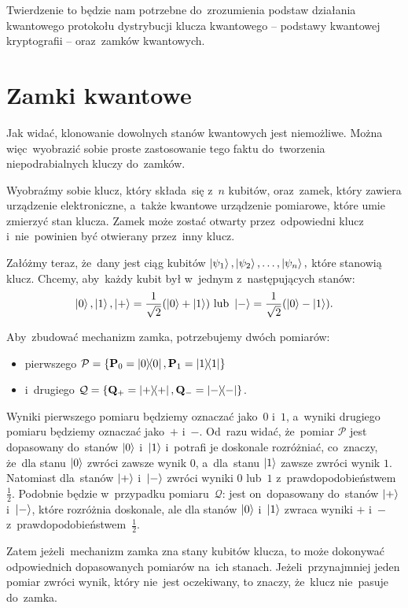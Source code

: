 Twierdzenie to będzie nam potrzebne do~zrozumienia podstaw działania kwantowego
protokołu dystrybucji klucza kwantowego -- podstawy kwantowej kryptografii --
oraz~zamków kwantowych.

\section{Zamki kwantowe}
Jak widać, klonowanie dowolnych stanów kwantowych jest niemożliwe. Można więc~wyobrazić
sobie proste zastosowanie tego faktu do~tworzenia niepodrabialnych
kluczy do~zamków.

Wyobraźmy sobie klucz, który składa~się z~$n$ kubitów, oraz~zamek, który zawiera
urządzenie elektroniczne, a~także kwantowe urządzenie pomiarowe, które umie zmierzyć
stan klucza. Zamek może zostać otwarty przez~odpowiedni klucz
i~nie~powinien być otwierany przez~inny klucz.

Załóżmy teraz, że~dany jest ciąg kubitów
$
	\ket{\psi_1},\ket{\psi_2},\ldots,\ket{\psi_n},
$
które stanowią klucz.
Chcemy, aby~każdy kubit był w~jednym z~następujących stanów:
$$
	\ket{0}, \ket{1}, \ket{+}=\frac{1}{\sqrt{2}}(\ket{0}+\ket{1}) \text{ lub } \ket{-}=\frac{1}{\sqrt{2}}(\ket{0}-\ket{1}).
$$

Aby~zbudować mechanizm zamka, potrzebujemy dwóch pomiarów:
\begin{itemize}
	\item pierwszego $\mathcal{P}=\{\mathbf{P}_0=\ketbra{0}{0}, \mathbf{P}_1=\ketbra{1}{1}\}$
	\item i~drugiego
	      $\mathcal{Q}=\{\mathbf{Q}_+=\ketbra{+}{+}, \mathbf{Q}_-=\ketbra{-}{-}\}$.
\end{itemize}
Wyniki pierwszego pomiaru
będziemy oznaczać jako~$0$ i~$1$, a~wyniki drugiego pomiaru będziemy oznaczać jako~$+$ i~$-$. Od~razu widać, że~pomiar
$\mathcal{P}$ jest dopasowany do~stanów $\ket{0}$ i~$\ket{1}$ i~potrafi
je doskonale rozróżniać, co~znaczy, że~dla stanu $\ket{0}$ zwróci zawsze wynik
$0$, a~dla~stanu $\ket{1}$ zawsze zwróci wynik $1$. Natomiast dla~stanów
$\ket{+}$ i~$\ket{-}$ zwróci wyniki $0$ lub~$1$ z~prawdopodobieństwem
$\frac{1}{2}$. Podobnie będzie w~przypadku pomiaru~$\mathcal{Q}$: jest
on~dopasowany do~stanów $\ket{+}$ i~$\ket{-}$, które rozróżnia doskonale,
ale dla stanów $\ket{0}$ i~$\ket{1}$ zwraca wyniki $+$ i~$-$ z~prawdopodobieństwem~$\frac{1}{2}$.

Zatem jeżeli~mechanizm zamka zna stany kubitów klucza, to może dokonywać
odpowiednich dopasowanych pomiarów na~ich stanach. Jeżeli~przynajmniej jeden pomiar zwróci
wynik, który nie~jest oczekiwany, to znaczy, że~klucz nie~pasuje do~zamka.

